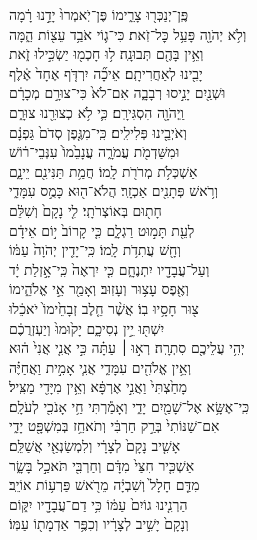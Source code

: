 \documentclass[11pt, openany]{book}
\begin{document}
פֶּֽן־יְנַכְּר֖וּ צָרֵ֑ימוֹ \hfill פֶּן־יֹֽאמְרוּ֙ יָדֵ֣נוּ רָ֔מָה\\
וְלֹ֥א יְהֹוָ֖ה פָּעַ֥ל כׇּל־זֹֽאת׃ \hfill כִּי־ג֛וֹי אֹבַ֥ד עֵצ֖וֹת הֵ֑מָּה\\
וְאֵ֥ין בָּהֶ֖ם תְּבוּנָֽה׃ \hfill ל֥וּ חָכְמ֖וּ יַשְׂכִּ֣ילוּ זֹ֑את\\
יָבִ֖ינוּ לְאַחֲרִיתָֽם׃ \hfill אֵיכָ֞ה יִרְדֹּ֤ף אֶחָד֙ אֶ֔לֶף\\
וּשְׁנַ֖יִם יָנִ֣יסוּ רְבָבָ֑ה \hfill אִם־לֹא֙ כִּי־צוּרָ֣ם מְכָרָ֔ם\\
וַֽיְהֹוָ֖ה הִסְגִּירָֽם׃ \hfill 	כִּ֛י לֹ֥א כְצוּרֵ֖נוּ צוּרָ֑ם\\
וְאֹיְבֵ֖ינוּ פְּלִילִֽים׃ \hfill כִּֽי־מִגֶּ֤פֶן סְדֹם֙ גַּפְנָ֔ם\\
וּמִשַּׁדְמֹ֖ת עֲמֹרָ֑ה \hfill עֲנָבֵ֙מוֹ֙ עִנְּבֵי־ר֔וֹשׁ\\
אַשְׁכְּלֹ֥ת מְרֹרֹ֖ת לָֽמוֹ׃ \hfill חֲמַ֥ת תַּנִּינִ֖ם יֵינָ֑ם\\
וְרֹ֥אשׁ פְּתָנִ֖ים אַכְזָֽר׃ \hfill הֲלֹא־ה֖וּא כָּמֻ֣ס עִמָּדִ֑י\\
חָת֖וּם בְּאוֹצְרֹתָֽי׃ \hfill 	לִ֤י נָקָם֙ וְשִׁלֵּ֔ם\\
לְעֵ֖ת תָּמ֣וּט רַגְלָ֑ם \hfill 	כִּ֤י קָרוֹב֙ י֣וֹם אֵידָ֔ם\\
וְחָ֖שׁ עֲתִדֹ֥ת לָֽמוֹ׃ \hfill 	כִּֽי־יָדִ֤ין יְהֹוָה֙ עַמּ֔וֹ\\
וְעַל־עֲבָדָ֖יו יִתְנֶחָ֑ם \hfill כִּ֤י יִרְאֶה֙ כִּֽי־אָ֣זְלַת יָ֔ד\\
וְאֶ֖פֶס עָצ֥וּר וְעָזֽוּב׃ \hfill וְאָמַ֖ר אֵ֣י אֱלֹהֵ֑ימוֹ\\
צ֖וּר חָסָ֥יוּ בֽוֹ׃ \hfill אֲשֶׁ֨ר חֵ֤לֶב זְבָחֵ֙ימוֹ֙ יֹאכֵ֔לוּ\\
יִשְׁתּ֖וּ יֵ֣ין נְסִיכָ֑ם \hfill יָק֙וּמוּ֙ וְיַעְזְרֻכֶ֔ם\\
יְהִ֥י עֲלֵיכֶ֖ם סִתְרָֽה׃ \hfill רְא֣וּ ׀ עַתָּ֗ה כִּ֣י אֲנִ֤י אֲנִי֙ ה֔וּא\\
וְאֵ֥ין אֱלֹהִ֖ים עִמָּדִ֑י \hfill אֲנִ֧י אָמִ֣ית וַאֲחַיֶּ֗ה\\
מָחַ֙צְתִּי֙ וַאֲנִ֣י אֶרְפָּ֔א \hfill וְאֵ֥ין מִיָּדִ֖י מַצִּֽיל׃\\
כִּֽי־אֶשָּׂ֥א אֶל־שָׁמַ֖יִם יָדִ֑י \hfill וְאָמַ֕רְתִּי חַ֥י אָנֹכִ֖י לְעֹלָֽם׃\\
אִם־שַׁנּוֹתִי֙ בְּרַ֣ק חַרְבִּ֔י \hfill וְתֹאחֵ֥ז בְּמִשְׁפָּ֖ט יָדִ֑י\\
אָשִׁ֤יב נָקָם֙ לְצָרָ֔י \hfill וְלִמְשַׂנְאַ֖י אֲשַׁלֵּֽם׃\\
אַשְׁכִּ֤יר חִצַּי֙ מִדָּ֔ם \hfill וְחַרְבִּ֖י תֹּאכַ֣ל בָּשָׂ֑ר\\
מִדַּ֤ם חָלָל֙ וְשִׁבְיָ֔ה \hfill מֵרֹ֖אשׁ פַּרְע֥וֹת אוֹיֵֽב׃\\
הַרְנִ֤ינוּ גוֹיִם֙ עַמּ֔וֹ \hfill כִּ֥י דַם־עֲבָדָ֖יו יִקּ֑וֹם\\
וְנָקָם֙ יָשִׁ֣יב לְצָרָ֔יו \hfill וְכִפֶּ֥ר אַדְמָת֖וֹ עַמּֽוֹ׃\\
\end{document}

